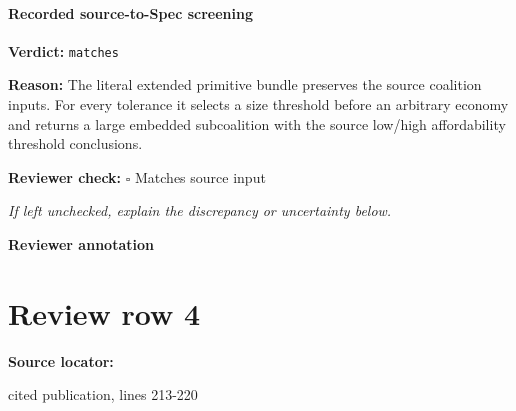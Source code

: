 \documentclass[10pt]{article}
\newcommand{\reviewerbox}{%
  \par\noindent\fbox{\parbox{0.96\linewidth}{\rule{0pt}{0.38in}}}\par
}
\newcommand{\reviewmatch}[1]{%
  \par\noindent\textbf{Reviewer check:} $\square$\; #1\par
  \noindent\emph{If left unchecked, explain the discrepancy or uncertainty below.}\par
}
\begin{document}
\paragraph{Recorded source-to-Spec screening}
\textbf{Verdict:} \texttt{matches}
\\
{\raggedright
\textbf{Reason:} The literal extended primitive bundle preserves the source coalition inputs.\allowbreak{} For every tolerance it selects a size threshold before an arbitrary economy and returns a large embedded subcoalition with the source low/\allowbreak{}high affordability threshold conclusions.\allowbreak{}
\par}
\reviewmatch{Matches source input}
\noindent\textbf{Reviewer annotation}\par
\reviewerbox
\clearpage
\hypertarget{source-claim-09a28f818364c658}{}
\section*{Review row 4}
\textbf{Source locator:} {\footnotesize\raggedright cited publication, lines 213-\allowbreak{}220\par}
\end{document}
